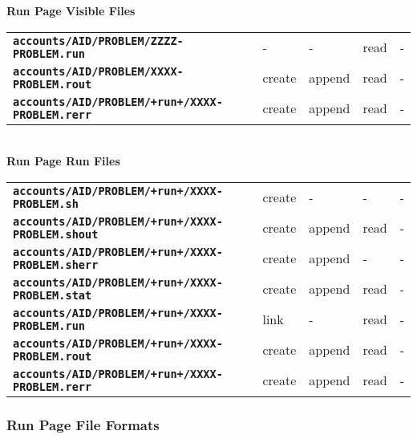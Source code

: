 \documentclass[12pt]{article}
\newcommand{\TT}[1]{{\tt \bfseries #1}}
\begin{document}
\begin{center}
{\bf Run Page Visible Files}
\\[1ex]
\begin{tabular}{lllll}
\TT{accounts/AID/PROBLEM/ZZZZ-PROBLEM.run}  & -  & - & read & - \\
\TT{accounts/AID/PROBLEM/XXXX-PROBLEM.rout} & create  & append  & read & - \\
\TT{accounts/AID/PROBLEM/+run+/XXXX-PROBLEM.rerr}
					    & create  & append  & read & - \\
\end{tabular}
\\\bigskip
{\bf Run Page Run Files}
\\[1ex]
\begin{tabular}{lllll}
\TT{accounts/AID/PROBLEM/+run+/XXXX-PROBLEM.sh}     & create  & - & - & - \\
\TT{accounts/AID/PROBLEM/+run+/XXXX-PROBLEM.shout}  & create  & append & read
                                                                       & - \\
\TT{accounts/AID/PROBLEM/+run+/XXXX-PROBLEM.sherr}  & create  & append & -
                                                                       & - \\
\TT{accounts/AID/PROBLEM/+run+/XXXX-PROBLEM.stat}   & create  & append & read
                                                                       & - \\
\TT{accounts/AID/PROBLEM/+run+/XXXX-PROBLEM.run}    & link    & - & read & - \\
\TT{accounts/AID/PROBLEM/+run+/XXXX-PROBLEM.rout}   & create  & append & read
                                                                       & - \\
\TT{accounts/AID/PROBLEM/+run+/XXXX-PROBLEM.rerr}   & create  & append & read
                                                                       & - \\
\end{tabular}
\end{center}

\subsubsection{Run Page File Formats}
\end{document}
